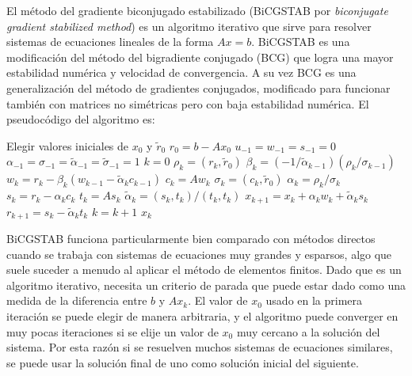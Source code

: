 
El método del gradiente biconjugado estabilizado (BiCGSTAB por \textit{biconjugate gradient stabilized method}) es un algoritmo iterativo que sirve para resolver sistemas de ecuaciones lineales de la forma $Ax=b$. BiCGSTAB es una modificación del método del bigradiente conjugado (BCG) que logra una mayor estabilidad numérica y velocidad de convergencia. A su vez BCG es una generalización del método de gradientes conjugados, modificado para funcionar también con matrices no simétricas pero con baja estabilidad numérica. El pseudocódigo del algoritmo es: \cite{yousef}

\clearpage

\newcommand{\walfa}{\widetilde{\alpha}}
\newcommand{\wsigma}{\widetilde{\sigma}}
\newcommand{\wrcero}{\widetilde{r}_0}

\begin{algorithmic}
	\STATE Elegir valores iniciales de $x_0$ y $\wrcero$
	\STATE $r_0 = b - A x_0$
	\STATE $u_{-1} = w_{-1} = s_{-1} = 0$
	\STATE $\alpha_{-1} = \sigma_{-1} = \walfa_{-1} = \wsigma_{-1} = 1$
	\STATE $k = 0$
	\REPEAT
		\STATE $\rho_k = \left( r_k, \wrcero \right)$
		\STATE $\beta_k = (-1 / \walfa_{k-1}) (\rho_k / \sigma_{k-1})$
		\STATE $w_k = r_k - \beta_k (w_{k-1} - \walfa_{k} c_{k-1})$
		\STATE $c_k = A w_k$
		\STATE $\sigma_k = (c_k, \wrcero)$
		\STATE $\alpha_k = \rho_k / \sigma_k$
		\STATE $s_k = r_k - \alpha_k c_k$
		\STATE $t_k = A s_k$ 
		\STATE $\walfa_{k} = (s_k,t_k) / (t_k, t_k)$
		\STATE $x_{k+1} = x_k + \alpha_k w_k + \walfa_{k} s_k$
		\STATE $r_{k+1} = s_k - \walfa_{k} t_k$
		\STATE $k = k + 1$
	\RETURN $x_k$
\end{algorithmic}


BiCGSTAB funciona particularmente bien comparado con métodos directos cuando se trabaja con sistemas de ecuaciones muy grandes y esparsos, algo que suele suceder a menudo al aplicar el método de elementos finitos. Dado que es un algoritmo iterativo, necesita un criterio de parada que puede estar dado como una medida de la diferencia entre $b$ y $A x_k$. El valor de $x_0$ usado en la primera iteración se puede elegir de manera arbitraria, y el algoritmo puede converger en muy pocas iteraciones si se elije un valor de $x_0$ muy cercano a la solución del sistema. Por esta razón si se resuelven muchos sistemas de ecuaciones similares, se puede usar la solución final de uno como solución inicial del siguiente. 

